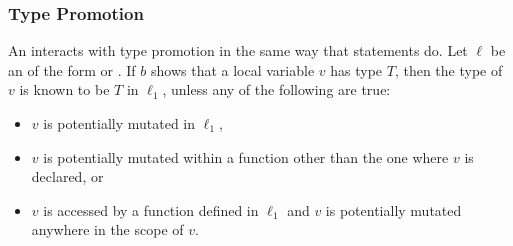 \documentclass[makeidx]{article}
\begin{document}
{%


\subsubsection{Type Promotion}

\LMHash{}%
An  interacts with type promotion
in the same way that \IF{} statements do.
Let $\ell$ be an  of the form
 or
.
If $b$ shows that a local variable $v$ has type $T$, then
the type of $v$ is known to be $T$ in $\ell_1$,
unless any of the following are true:

\begin{itemize}
\item $v$ is potentially mutated in $\ell_1$,
\item $v$ is potentially mutated within a function
  other than the one where $v$ is declared, or
\item $v$ is accessed by a function defined in $\ell_1$ and
  $v$ is potentially mutated anywhere in the scope of $v$.
\end{itemize}



}
\end{document}
